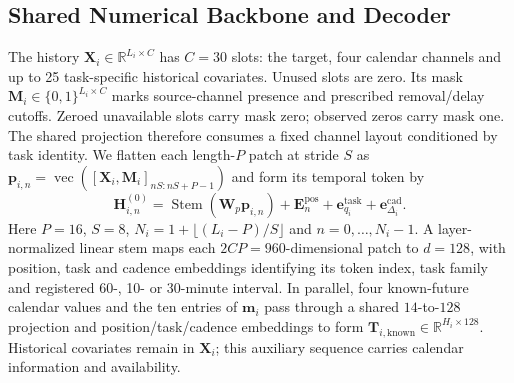\documentclass[journal]{IEEEtran}
\begin{document}
\subsection{Shared Numerical Backbone and Decoder}

The history $\mathbf X_i\in\mathbb R^{L_i\times C}$ has $C=30$ slots: the target, four calendar channels and up to 25 task-specific historical covariates. Unused slots are zero. Its mask $\mathbf M_i\in\{0,1\}^{L_i\times C}$ marks source-channel presence and prescribed removal/delay cutoffs. Zeroed unavailable slots carry mask zero; observed zeros carry mask one. The shared projection therefore consumes a fixed channel layout conditioned by task identity. We flatten each length-$P$ patch at stride $S$ as $\mathbf p_{i,n}=\operatorname{vec}([\mathbf X_i,\mathbf M_i]_{nS:nS+P-1})$ and form its temporal token by
\begin{equation}
\label{eq:numerical-representation}
\mathbf H_{i,n}^{(0)}=\operatorname{Stem}(\mathbf W_p\mathbf p_{i,n})
+\mathbf E_n^{\mathrm{pos}}+\mathbf e_{q_i}^{\mathrm{task}}
+\mathbf e_{\Delta_i}^{\mathrm{cad}}.
\end{equation}
Here $P=16$, $S=8$, $N_i=1+\lfloor(L_i-P)/S\rfloor$ and $n=0,\ldots,N_i-1$. A layer-normalized linear stem maps each $2CP=960$-dimensional patch to $d=128$, with position, task and cadence embeddings identifying its token index, task family and registered 60-, 10- or 30-minute interval. In parallel, four known-future calendar values and the ten entries of $\mathbf m_i$ pass through a shared $14$-to-$128$ projection and position/task/cadence embeddings to form $\mathbf T_{i,\mathrm{known}}\in\mathbb R^{H_i\times128}$. Historical covariates remain in $\mathbf X_i$; this auxiliary sequence carries calendar information and availability.

\end{document}
